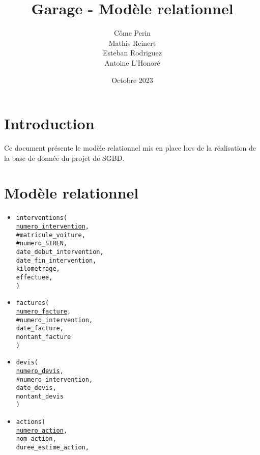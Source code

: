 \documentclass[a4paper,11pt]{article} %
\title{Garage - Modèle relationnel}
\author{Côme Perin \\
        Mathis Reinert \\
        Esteban Rodriguez \\
        Antoine L'Honoré}
\date{Octobre 2023}
\begin{document}
\maketitle

\section{Introduction}
Ce document présente le modèle relationnel mis en place lors de la réalisation de la base de donnée du projet de SGBD.

\section{Modèle relationnel}
\fontsize{9pt}{10.8pt}\selectfont

\begin{itemize}[leftmargin=*]
    \item \texttt{interventions( \\
        \underline{numero\_intervention}, \\
        \#matricule\_voiture, \\
        \#numero\_SIREN, \\
        date\_debut\_intervention, \\
        date\_fin\_intervention, \\
        kilometrage, \\
        effectuee, \\
    )}
    \item \texttt{factures( \\
        \underline{numero\_facture}, \\
        \#numero\_intervention, \\
        date\_facture, \\
        montant\_facture \\
    )}
    \item \texttt{devis( \\
        \underline{numero\_devis}, \\
        \#numero\_intervention, \\
        date\_devis, \\
        montant\_devis \\
    )}
    \item \texttt{actions( \\
        \underline{numero\_action}, \\
        nom\_action, \\
        duree\_estime\_action, \\
}
\end{itemize}
\end{document}

